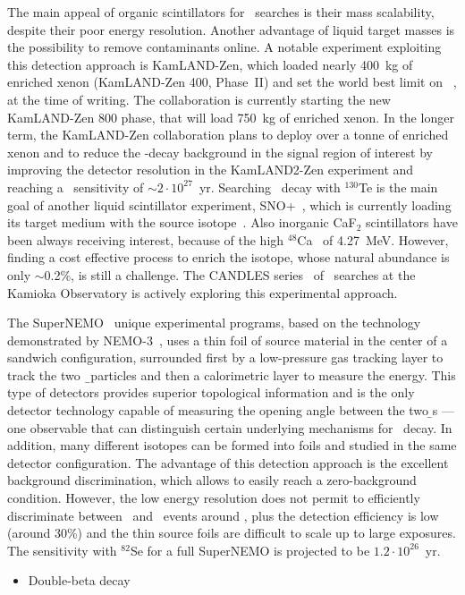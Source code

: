 \begin{description}[wide]
  \item[Scintillators] The main appeal of organic scintillators for \onbb\
    searches is their mass scalability, despite their poor energy resolution.
    Another advantage of liquid target masses is the possibility to remove
    contaminants online. A notable experiment exploiting this detection
    approach is KamLAND-Zen, which loaded nearly 400~kg of enriched xenon
    (KamLAND-Zen 400, Phase~II) and set the world best limit on
    \thalfzero~\cite{Gando2016}, at the time of writing. The collaboration is
    currently starting the new KamLAND-Zen 800 phase, that will load 750~kg of
    enriched xenon. In the longer term, the KamLAND-Zen collaboration plans to
    deploy over a tonne of enriched xenon and to reduce the \nnbb-decay
    background in the signal region of interest by improving the detector
    resolution in the KamLAND2-Zen experiment and reaching a \thalfzero\
    sensitivity of ${\sim}2 \cdot 10^{27}$~yr. Searching \onbb\ decay with
    $^{130}$Te is the main goal of another liquid scintillator experiment,
    SNO+~\cite{Andringa2015}, which is currently loading its target medium with
    the source isotope~\cite{Paton2019}. Also inorganic CaF$_2$ scintillators
    have been always receiving interest, because of the high $^{48}$Ca \qbb\ of
    4.27~MeV. However, finding a cost effective process to enrich the isotope,
    whose natural abundance is only $\sim$0.2\%, is still a challenge. The
    CANDLES series~\cite{Umehara2015} of \onbb\ searches at the Kamioka
    Observatory is actively exploring this experimental approach.

  \item[Tracking Calorimeters] The SuperNEMO~\cite{Arnold2010} unique
    experimental programs, based on the technology demonstrated by
    NEMO-3~\cite{Arnold2004}, uses a thin foil of source material in the center
    of a sandwich configuration, surrounded first by a low-pressure gas
    tracking layer to track the two \b\ particles and then a calorimetric layer
    to measure the energy. This type of detectors provides superior topological
    information and is the only detector technology capable of measuring the
    opening angle between the two {\b}s --- one observable that can distinguish
    certain underlying mechanisms for \onbb\ decay. In addition, many different
    isotopes can be formed into foils and studied in the same detector
    configuration. The advantage of this detection approach is the excellent
    background discrimination, which allows to easily reach a zero-background
    condition. However, the low energy resolution does not permit to
    efficiently discriminate between \nnbb\ and \onbb\ events around \qbb, plus
    the detection efficiency is low (around 30\%) and the thin source foils are
    difficult to scale up to large exposures. The sensitivity with $^{82}$Se
    for a full SuperNEMO is projected to be $1.2 \cdot 10^{26}$~yr.
\end{description}

\chapsummary
\begin{itemize}
  \item Double-beta decay
\end{itemize}

